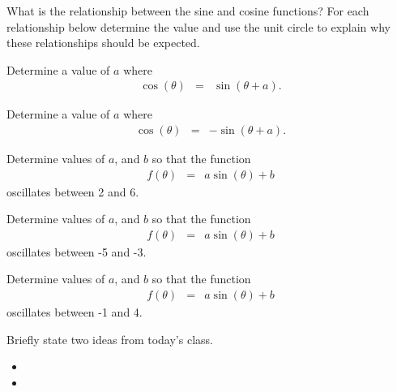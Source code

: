 \begin{problem}
  \clearpage

\item What is the relationship between the sine and cosine functions?
  For each relationship below determine the value and use the unit
  circle to explain why these relationships should be expected.
  \begin{subproblem}
  \item Determine a value of $a$ where
    \begin{eqnarray*}
      \cos(\theta) & = & \sin(\theta+a).
    \end{eqnarray*}
    \vfill
  \item Determine a value of $a$ where
    \begin{eqnarray*}
      \cos(\theta) & = & -\sin(\theta+a).
    \end{eqnarray*}
    \vfill

    \clearpage

  \item Determine values of $a$, and $b$ so that the function
    \begin{eqnarray*}
      f(\theta) & = & a\sin(\theta)+b
    \end{eqnarray*}
    oscillates between 2 and 6.
    \vfill

  \item Determine values of $a$, and $b$ so that the function
    \begin{eqnarray*}
      f(\theta) & = & a\sin(\theta)+b
    \end{eqnarray*}
    oscillates between -5 and -3.
    \vfill


  \item Determine values of $a$, and $b$ so that the function
    \begin{eqnarray*}
      f(\theta) & = & a\sin(\theta)+b
    \end{eqnarray*}
    oscillates between -1 and 4.
    \vfill
  \end{subproblem}

\end{problem}

\postClass

\begin{problem}
\item Briefly state two ideas from today's class.
  \begin{itemize}
  \item
  \item
  \end{itemize}
\item
  \begin{subproblem}
    \item
  \end{subproblem}
\end{problem}


